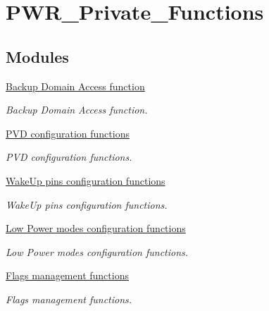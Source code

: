 \hypertarget{group___p_w_r___private___functions}{\section{P\-W\-R\-\_\-\-Private\-\_\-\-Functions}
\label{group___p_w_r___private___functions}
}
\subsection*{Modules}
\begin{DoxyCompactItemize}
\item 
\hyperlink{group___p_w_r___group1}{Backup Domain Access function}
\begin{DoxyCompactList}\small\item\em Backup Domain Access function. \end{DoxyCompactList}\item 
\hyperlink{group___p_w_r___group2}{P\-V\-D configuration functions}
\begin{DoxyCompactList}\small\item\em P\-V\-D configuration functions. \end{DoxyCompactList}\item 
\hyperlink{group___p_w_r___group3}{Wake\-Up pins configuration functions}
\begin{DoxyCompactList}\small\item\em Wake\-Up pins configuration functions. \end{DoxyCompactList}\item 
\hyperlink{group___p_w_r___group4}{Low Power modes configuration functions}
\begin{DoxyCompactList}\small\item\em Low Power modes configuration functions. \end{DoxyCompactList}\item 
\hyperlink{group___p_w_r___group5}{Flags management functions}
\begin{DoxyCompactList}\small\item\em Flags management functions. \end{DoxyCompactList}\end{DoxyCompactItemize}
